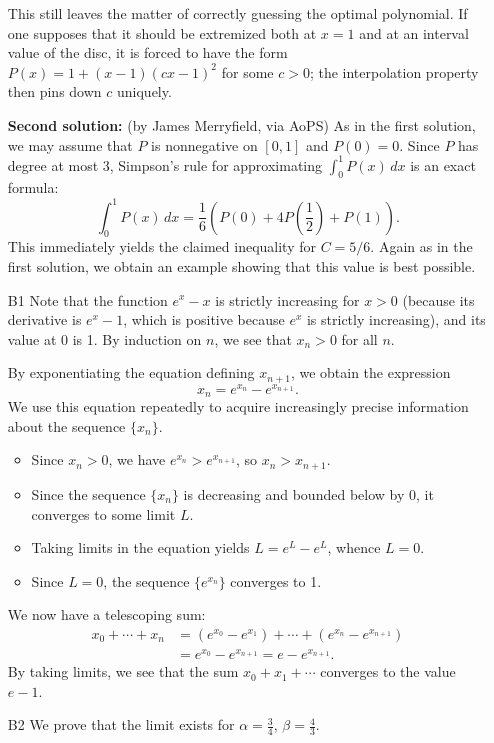 \documentclass[amssymb,twocolumn,pra,10pt,aps]{revtex4-1}
\begin{document}
\begin{itemize}
This still leaves the matter of correctly guessing the optimal polynomial. If one supposes that it should be extremized both at $x=1$ and at an interval value of the disc, it is forced to have the form $P(x) = 1 + (x-1)(cx-1)^2$ for some $c>0$; the interpolation property then pins down $c$ uniquely.

\noindent
\textbf{Second solution:}
(by James Merryfield, via AoPS)
As in the first solution, we may assume that $P$ is nonnegative on $[0,1]$ and $P(0)= 0$.
Since $P$ has degree at most 3, Simpson's rule for approximating $\int_0^1 P(x)\,dx$ is an exact formula:
\[
\int_0^1 P(x)\,dx = \frac{1}{6}( P(0) + 4 P\left( \frac{1}{2} \right) + P(1)).
\]
This immediately yields the claimed inequality for $C = 5/6$. Again as in the first solution,
we obtain an example showing that this value is best possible.

\item[B1]
Note that the function $e^x - x$ is strictly increasing for $x>0$ (because its derivative is $e^x - 1$, which is positive because $e^x$ is strictly increasing), and its value at 0 is 1.
By induction on $n$, we see that $x_n > 0$ for all $n$.

By exponentiating the equation defining $x_{n+1}$, we obtain the expression
\[
x_n = e^{x_n} - e^{x_{n+1}}.
\]
We use this equation repeatedly to acquire increasingly precise information about the sequence $\{x_n\}$.
\begin{itemize}
\item
Since $x_n > 0$, we have $e^{x_n} > e^{x_{n+1}}$, so $x_n > x_{n+1}$.
\item
Since the sequence $\{x_n\}$ is decreasing and bounded below by 0, it converges to some limit $L$.
\item
Taking limits in the equation yields $L = e^L - e^L$, whence $L = 0$.
\item
Since $L = 0$, the sequence $\{e^{x_n}\}$ converges to 1.
\end{itemize}

We now have a telescoping sum:
\begin{align*}
x_0 + \cdots + x_n &= (e^{x_0} - e^{x_1}) + \cdots + (e^{x_n} - e^{x_{n+1}}) \\
&=e^{x_0} - e^{x_{n+1}} = e - e^{x_{n+1}}.
\end{align*}
By taking limits, we see that the sum $x_0 + x_1 + \cdots$ converges to the value
$e-1$.

\item[B2]
We prove that the limit exists for $\alpha = \frac{3}{4}$, $\beta =\frac{4}{3}$. 


\end{itemize}
\end{document}
